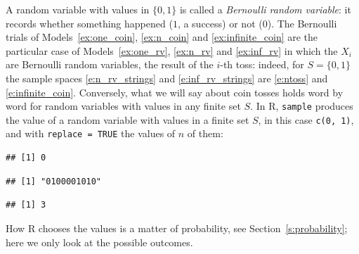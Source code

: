 \begin{remark}
	\label{r:bernoulli_rv}
	A random variable with values in $\{0, 1\}$ is called a \emph{Bernoulli random variable}: it records whether something happened ($1$, a success) or not ($0$). The Bernoulli trials of Models~\ref{ex:one_coin}, \ref{ex:n_coin} and \ref{ex:infinite_coin} are the particular case of Models~\ref{ex:one_rv}, \ref{ex:n_rv} and \ref{ex:inf_rv} in which the $X_i$ are Bernoulli random variables, the result of the $i$-th toss: indeed, for $S = \{0, 1\}$ the sample spaces \eqref{e:n_rv_strings} and \eqref{e:inf_rv_strings} are \eqref{e:ntoss} and \eqref{e:infinite_coin}. Conversely, what we will say about coin tosses holds word by word for random variables with values in any finite set $S$. 
	In R, \texttt{sample} produces the value of a random variable with values in a finite set $S$, in this case \texttt{c(0, 1)}, and with \texttt{replace = TRUE} the values of $n$ of them: 
\begin{knitrout}
\color{fgcolor}\begin{kframe}
\begin{alltt}
\hldef{(}\hldef{(}\hldef{,} \hldef{),} \hldef{)}                          
\end{alltt}
\begin{verbatim}
## [1] 0
\end{verbatim}
\begin{alltt}
 \hlkwb{<-} \hldef{(}\hldef{(}\hldef{,} \hldef{),} \hldef{,}  \hldef{=} \hldef{)}    
  \hldef{=} \hldef{)}                     
\end{alltt}
\begin{verbatim}
## [1] "0100001010"
\end{verbatim}
\begin{alltt}
                                      
\end{alltt}
\begin{verbatim}
## [1] 3
\end{verbatim}
\end{kframe}
\end{knitrout}
	How R chooses the values is a matter of probability, see Section~\ref{s:probability}; here we only look at the possible outcomes. 
\end{remark}

